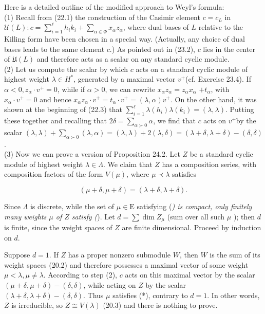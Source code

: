 \documentclass[10pt]{article}
\begin{document}
Here is a detailed outline of the modified approach to Weyl's formula:\\
(1) Recall from (22.1) the construction of the Casimir element $c=c_{L}$ in $\mathcal{U}(L): c=\sum_{i=1}^{\ell} h_{i} k_{i}+\sum_{\alpha \in \Phi} x_{\alpha} z_{\alpha}$, where dual bases of $L$ relative to the Killing form have been chosen in a special way. (Actually, any choice of dual bases leads to the same element $c$.) As pointed out in (23.2), $c$ lies in the center of $\mathfrak{U}(L)$ and therefore acts as a scalar on any standard cyclic module.\\
(2) Let us compute the scalar by which $c$ acts on a standard cyclic module of highest weight $\lambda \in H^{*}$, generated by a maximal vector $v^{+}$(cf. Exercise 23.4). If $\alpha<0, z_{\alpha} \cdot v^{+}=0$, while if $\alpha>0$, we can rewrite $x_{\alpha} z_{\alpha}=z_{\alpha} x_{\alpha}$ $+t_{\alpha}$, with $x_{\alpha} \cdot v^{+}=0$ and hence $x_{\alpha} z_{\alpha} \cdot v^{+}=t_{\alpha} \cdot v^{+}=(\lambda, \alpha) v^{+}$. On the other hand, it was shown at the beginning of (22.3) that $\sum_{i=1}^{\ell} \lambda\left(h_{i}\right) \lambda\left(k_{i}\right)=(\lambda, \lambda)$. Putting these together and recalling that $2 \delta=\sum_{\alpha \succ 0} \alpha$, we find that $c$ acts on $v^{+}$by the scalar $(\lambda, \lambda)+\sum_{\alpha \succ 0}(\lambda, \alpha)=(\lambda, \lambda)+2(\lambda, \delta)=(\lambda+\delta, \lambda+\delta)-(\delta, \delta)$.\\
(3) Now we can prove a version of Proposition 24.2. Let $Z$ be a standard cyclic module of highest weight $\lambda \in \Lambda$. We claim that $Z$ has a composition series, with composition factors of the form $V(\mu)$, where $\mu \prec \lambda$ satisfies


\begin{equation*}
(\mu+\delta, \mu+\delta)=(\lambda+\delta, \lambda+\delta) . \tag{*}
\end{equation*}


Since $\Lambda$ is discrete, while the set of $\mu \in \mathrm{E}$ satisfying (\textit{) is compact, only finitely many weights $\mu$ of $Z$ satisfy (}). Let $d=\sum \operatorname{dim} Z_{\mu}$ (sum over all such $\mu$ ); then $d$ is finite, since the weight spaces of $Z$ are finite dimensional. Proceed by induction on $d$.

Suppose $d=1$. If $Z$ has a proper nonzero submodule $W$, then $W$ is the sum of its weight spaces (20.2) and therefore possesses a maximal vector of some weight $\mu<\lambda, \mu \neq \lambda$. According to step (2), $c$ acts on this maximal vector by the scalar $(\mu+\delta, \mu+\delta)-(\delta, \delta)$, while acting on $Z$ by the scalar\\
$(\lambda+\delta, \lambda+\delta)-(\delta, \delta)$. Thus $\mu$ satisfies (*), contrary to $d=1$. In other words, $Z$ is irreducible, so $Z \cong V(\lambda)$ (20.3) and there is nothing to prove.
\end{document}
